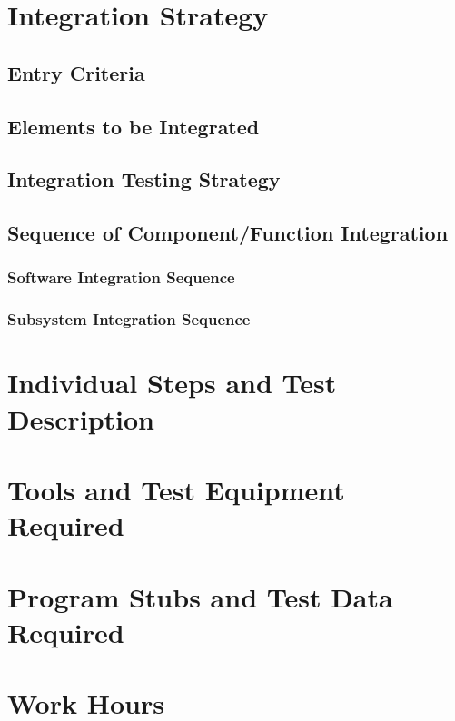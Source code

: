 \documentclass[11pt, a4paper,titlepage]{article}
\begin{document}
\section{Integration Strategy}
	
	\subsection{Entry Criteria}
	\subsection{Elements to be Integrated}
	
	\subsection{Integration Testing Strategy}
	\subsection{Sequence of Component/Function Integration}
	\subsubsection{Software Integration Sequence}
	\subsubsection{Subsystem Integration Sequence}
\section{Individual Steps and Test Description}
\section{Tools and Test Equipment Required}
\section{Program Stubs and Test Data Required}
\section{Work Hours}
\end{document}
